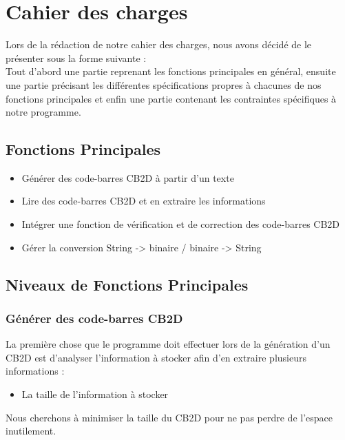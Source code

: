 \newpage 

\section{Cahier des charges}

Lors de la rédaction de notre cahier des charges, nous avons décidé de le présenter sous la forme suivante : \\
Tout d'abord une partie reprenant les fonctions principales en général, ensuite une partie précisant les différentes spécifications propres à chacunes de nos fonctions principales et enfin une partie contenant les contraintes spécifiques à notre programme. 

\subsection{Fonctions Principales}

\begin{itemize}
\item Générer des code-barres CB2D à partir d'un texte
\item Lire des code-barres CB2D et en extraire les informations
\item Intégrer une fonction de vérification et de correction des code-barres CB2D
\item Gérer la conversion String -> binaire / binaire -> String
\end{itemize}

\subsection{Niveaux de Fonctions Principales}

\subsubsection{Générer des code-barres CB2D} 

La première chose que le programme doit effectuer lors de la génération d'un CB2D est d'analyser l'information à stocker afin d'en extraire plusieurs informations : \\

\begin{itemize}
\item La taille de l'information à stocker
\end{itemize}
Nous cherchons à minimiser la taille du CB2D pour ne pas perdre de l'espace inutilement. \\

